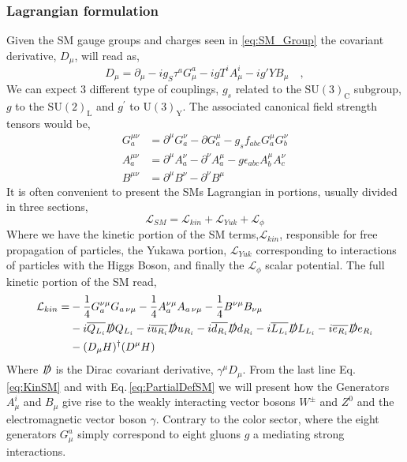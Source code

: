 \subsubsection{Lagrangian formulation }
%
Given the SM gauge groups and charges seen in \ref{eq:SM_Group} the covariant derivative, $D_\mu$, will read as, 
%
\begin{equation}
\label{eq:PartialDefSM}
D_\mu = \partial_\mu - i g_S \tau^a G^a_\mu - i g T^i A^i_\mu - i g' Y B_\mu \quad ,  
\end{equation}  
%
We can expect 3 different type of couplings, $g_s$ related to the $\mathrm{SU(3)_C}$ subgroup, $g$ to the $\mathrm{SU(2)_L}$ and $g^\prime$ to $\mathrm{U(3)_Y}$. The associated canonical field strength tensors would be,
\begin{align}
G_a^{\mu \nu} & = \partial^\mu G^\nu_a - \partial G^\mu_a - g_s f_{abc} G_a^\mu G_b^\nu  \\ 
A_a^{\mu \nu} & = \partial^\mu A^\nu_a - \partial^\nu A^\mu_a  - g \epsilon_{abc} A^\mu_b A^\nu_c \\
B^{\mu \nu}   & = \partial^\mu B^\nu - \partial^\nu B^\mu 
\end{align}
It is often convenient to present the SMs Lagrangian in portions, usually divided in three sections,
\begin{equation}
\mathcal{L}_{SM} = \mathcal{L}_{kin}  +  \mathcal{L}_{Yuk} +  \mathcal{L}_{\phi} 	
\end{equation}
Where we have the kinetic portion of the SM terms,$\mathcal{L}_{kin}$, responsible for  free propagation of particles, the Yukawa portion, $\mathcal{L}_{Yuk}$  corresponding to interactions of particles with the Higgs Boson, and finally the $\mathcal{L}_{\phi}$ scalar potential. The full kinetic portion of the SM read, 
%
\begin{align}
\label{eq:KinSM}
\mathcal{L}_{kin} = & - \frac{1}{4} G^{\nu \mu}_a G_{a \,\nu \mu}  - \frac{1}{4}  A^{\nu \mu}_a A_{a \,\nu \mu}  
- \frac{1}{4}  B^{\nu \mu} B_{\nu \mu} \nonumber \\ 
 & -i \overline{Q_{L_i}} \slashed{D} Q_{L_i} 
   -i \overline{u_{R_i}} \slashed{D} u_{R_i}  
   -i \overline{d_{R_i}} \slashed{D} d_{R_i}  
   -i \overline{L_{L_i}} \slashed{D} L_{L_i}    
   -i \overline{e_{R_i}} \slashed{D} e_{R_i}   \\
 & - (D_\mu H)^\dagger ( D^\mu H )   \nonumber 
\end{align}
Where $\slashed{D}$ is the Dirac covariant derivative, $\gamma^\mu D_\mu$. From the last line Eq.\,\ref{eq:KinSM} and with Eq.\,\ref{eq:PartialDefSM} we will present how the Generators $A^i_\mu$ and $B_\mu$ give rise to the weakly interacting vector bosons $W^\pm$ and $Z^0$ and the electromagnetic vector boson $\gamma$. Contrary to the color sector, where the eight generators $G^a_\mu$ simply correspond to eight gluons $g$ a mediating strong interactions.
